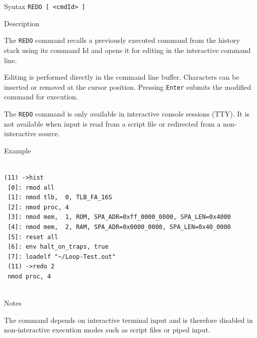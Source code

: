 %
%
\pagebreak


\begin{iPageDescEntry}{Syntax}
\texttt{REDO [ <cmdId> ]}
\end{iPageDescEntry}

\begin{iPageDescEntry}{Description}

The \texttt{REDO} command recalls a previously executed command from the history stack using its command Id and opens it for editing in the interactive command line.

Editing is performed directly in the command line buffer. Characters can be inserted or removed at the cursor position. Pressing \texttt{Enter} submits the modified command for execution.

The \texttt{REDO} command is only available in interactive console sessions (TTY). It is not available when input is read from a script file or redirected from a non-interactive source.

\end{iPageDescEntry}

\begin{iPageDescOpEntry}{Example}
\begin{lstlisting}[style=iPageOpStyle]

(11) ->hist
 [0]: rmod all
 [1]: nmod tlb,  0, TLB_FA_16S
 [2]: nmod proc, 4
 [3]: nmod mem,  1, ROM, SPA_ADR=0xff_0000_0000, SPA_LEN=0x4000
 [4]: nmod mem,  2, RAM, SPA_ADR=0x0000_0000, SPA_LEN=0x40_0000
 [5]: reset all
 [6]: env halt_on_traps, true
 [7]: loadelf "~/Loop-Test.out"
 (11) ->redo 2
 nmod proc, 4


\end{lstlisting}
\end{iPageDescOpEntry}

\begin{iPageDescEntry}{Notes}

The command depends on interactive terminal input and is therefore disabled in non-interactive execution modes such as script files or piped input.

\end{iPageDescEntry}